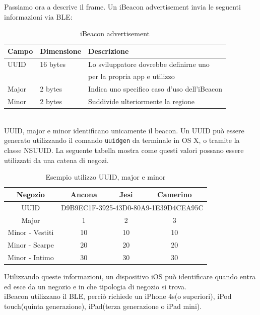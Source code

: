 Passiamo ora a descrive il frame.
Un iBeacon advertisement invia le seguenti informazioni via BLE:
\begin{table}[htbp]
\begin{center}
\begin{tabular}{|l|l|l|}
\hline
Campo & Dimensione & Descrizione \\
\hline
UUID & 16 bytes & Lo sviluppatore dovrebbe definirne uno\\
& & per la propria app e utilizzo \\
\hline
Major & 2 bytes & Indica uno specifico caso d'uso dell'iBeacon\\
\hline
Minor & 2 bytes & Suddivide ulteriormente la regione\\
\hline
\end{tabular}
\end{center}
\caption{iBeacon advertisement}
\label{tab:table}
\end{table}
\\UUID, major e minor identificano unicamente il beacon. 
Un UUID può essere generato utilizzando il comando \texttt{uuidgen} da terminale in OS X, o tramite  la classe NSUUID.
La seguente tabella mostra come questi valori possano essere utilizzati da una catena di negozi. 
\begin{table}[htbp]
\begin{center}
\begin{tabular}{|c|c|c|c|}
\hline
Negozio & Ancona & Jesi & Camerino \\
\hline
UUID &
\multicolumn{3}{c|}{D9B9EC1F-3925-43D0-80A9-1E39D4CEA95C} \\
\hline
Major & 1 & 2 & 3\\
\hline
Minor - Vestiti  & 10 & 10 & 10\\
\hline
Minor - Scarpe & 20 & 20 & 20\\
\hline
Minor - Intimo & 30 & 30 & 30\\
\hline
\end{tabular}
\end{center}
\caption{Esempio utilizzo UUID, major e minor}
\label{tab:table}
\end{table}
Utilizzando queste informazioni, un dispositivo iOS può identificare quando entra ed esce da un negozio e in che tipologia di negozio si trova. 
\\
iBeacon utilizzano il BLE, perciò richiede un iPhone 4s(o superiori), iPod touch(quinta generazione), iPad(terza generazione o iPad mini).
